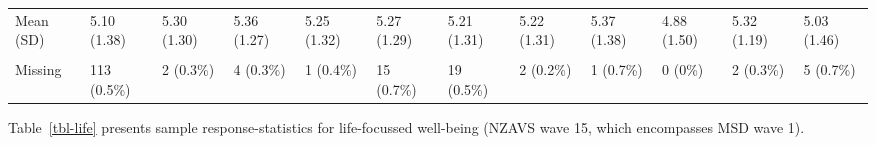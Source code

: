\documentclass[
  single column]{article}
\begin{document}
\begin{landscape}
\begin{longtable}[t]{llllllllllll}
\hspace{1em}Mean (SD) & 5.10 (1.38) & 5.30 (1.30) & 5.36 (1.27) & 5.25 (1.32) & 5.27 (1.29) & 5.21 (1.31) & 5.22 (1.31) & 5.37 (1.38) & 4.88 (1.50) & 5.32 (1.19) & 5.03 (1.46)\\
\cellcolor{gray!10}{\hspace{1em}Median [Min, Max]} & \cellcolor{gray!10}{5.33 [1.00, 7.00]} & \cellcolor{gray!10}{5.50 [1.00, 7.00]} & \cellcolor{gray!10}{5.67 [1.00, 7.00]} & \cellcolor{gray!10}{5.33 [1.00, 7.00]} & \cellcolor{gray!10}{5.50 [1.00, 7.00]} & \cellcolor{gray!10}{5.33 [1.00, 7.00]} & \cellcolor{gray!10}{5.33 [1.00, 7.00]} & \cellcolor{gray!10}{5.67 [1.00, 7.00]} & \cellcolor{gray!10}{5.33 [1.00, 7.00]} & \cellcolor{gray!10}{5.67 [1.00, 7.00]} & \cellcolor{gray!10}{5.33 [1.00, 7.00]}\\
\hspace{1em}Missing & 113 (0.5\%) & 2 (0.3\%) & 4 (0.3\%) & 1 (0.4\%) & 15 (0.7\%) & 19 (0.5\%) & 2 (0.2\%) & 1 (0.7\%) & 0 (0\%) & 2 (0.3\%) & 5 (0.7\%)\\*

\end{longtable}

\endgroup{}


\end{landscape}

\newpage{}

Table~\ref{tbl-life} presents sample response-statistics for
life-focussed well-being (NZAVS wave 15, which encompasses MSD wave 1).
\end{document}
